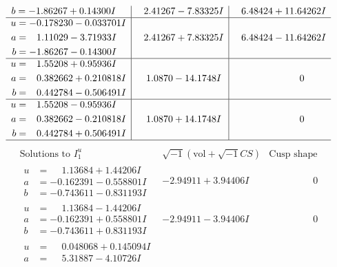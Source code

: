 \documentclass[1p]{elsarticle_modified}
\theoremstyle{definition}
\newcommand{\I}{\sqrt{-1}}
\begin{document}
$$\begin{array}{c|c|c}
\begin{aligned}
b &= -1.86267 + 0.14300 I\end{aligned}
 & \phantom{-}2.41267 - 7.83325 I & \phantom{-}6.48424 + 11.64262 I \\ \hline\begin{aligned}
u &= -0.178230 - 0.033701 I \\
a &= \phantom{-}1.11029 - 3.71933 I \\
b &= -1.86267 - 0.14300 I\end{aligned}
 & \phantom{-}2.41267 + 7.83325 I & \phantom{-}6.48424 - 11.64262 I \\ \hline\begin{aligned}
u &= \phantom{-}1.55208 + 0.95936 I \\
a &= \phantom{-}0.382662 + 0.210818 I \\
b &= \phantom{-}0.442784 - 0.506491 I\end{aligned}
 & \phantom{-}1.0870 - 14.1748 I & \phantom{-0.000000 } 0 \\ \hline\begin{aligned}
u &= \phantom{-}1.55208 - 0.95936 I \\
a &= \phantom{-}0.382662 - 0.210818 I \\
b &= \phantom{-}0.442784 + 0.506491 I\end{aligned}
 & \phantom{-}1.0870 + 14.1748 I & \phantom{-0.000000 } 0\\
 \hline 
 \end{array}$$\newpage$$\begin{array}{c|c|c}  
\text{Solutions to }I^u_{1}& \I (\text{vol} + \sqrt{-1}CS) & \text{Cusp shape}\\
 \hline 
\begin{aligned}
u &= \phantom{-}1.13684 + 1.44206 I \\
a &= -0.162391 - 0.558801 I \\
b &= -0.743611 - 0.831193 I\end{aligned}
 & -2.94911 + 3.94406 I & \phantom{-0.000000 } 0 \\ \hline\begin{aligned}
u &= \phantom{-}1.13684 - 1.44206 I \\
a &= -0.162391 + 0.558801 I \\
b &= -0.743611 + 0.831193 I\end{aligned}
 & -2.94911 - 3.94406 I & \phantom{-0.000000 } 0 \\ \hline\begin{aligned}
u &= \phantom{-}0.048068 + 0.145094 I \\
a &= \phantom{-}5.31887 - 4.10726 I \\

\end{aligned}
\end{array}$$
\end{document}

